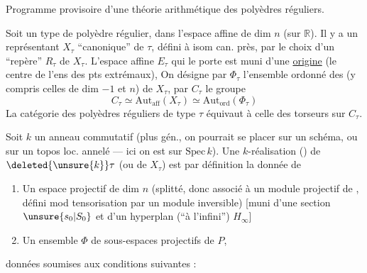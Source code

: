 Programme provisoire d'une théorie arithmétique des polyèdres réguliers.

Soit un type \inserted{$\tau$} de polyèdre régulier, dans l'espace affine de dim $n$ (sur $\mathbb R$). Il y a un représentant $X_\tau$ ``canonique'' de $\tau$, défini à isom can. près, par le choix d'un ``repère'' $R_\tau$ de $X_\tau$. L'espace affine $E_\tau$ qui le porte est muni d'une \uline{origine} (le centre de  l'ens des pts extrémaux),  On désigne par $\Phi_\tau$ l'ensemble ordonné des  (y compris celles de dim $-1$ et $n$) de $X_\tau$, par $C_\tau$ le groupe
\[
 C_\tau\simeq\mathrm{Aut}_{\mathrm{aff}}(X_\tau)\simeq\mathrm{Aut}_{\mathrm{ord}}(\Phi_\tau)
\]
La catégorie des polyèdres réguliers de type $\tau$ équivaut à celle des torseurs sur $C_\tau$.

Soit $k$ un anneau commutatif (plus gén., on pourrait se placer sur un schéma, ou sur un topos loc. annelé --- ici on est sur $\mathrm{Spec}\,k$). Une $k$-réalisation () de $\deleted{\unsure{k}}\tau$ (ou de $X_\tau$) est par définition la donnée de

\begin{enumerate}[label=\alph*)]
\item Un espace projectif  de dim $n$ (splitté, donc associé à un module projectif de , défini mod tensorisation par un module inversible) [muni d'une section $\unsure{s_0|S_0}$  et d'un hyperplan (``à l'infini'') $H_\infty$]
\item Un ensemble $\Phi$ de sous-espaces projectifs de $P$,
\end{enumerate}
données soumises aux conditions suivantes :
